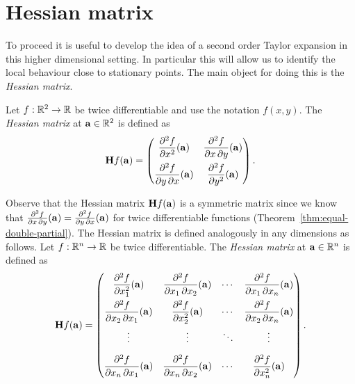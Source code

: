 \section{Hessian matrix}

To proceed it is useful to develop the idea of a second order Taylor expansion in this higher dimensional setting.
In particular this will allow us to identify the local behaviour close to stationary points.
The main object for doing this is the \emph{Hessian matrix}.

\begin{definition}
    Let \(f:\bR^2 \to\bR\) be twice differentiable and use the notation \(f(x,y)\).
    The \emph{Hessian matrix} at \(\aa\in \bR^2\) is defined as
    \[
        \mathbf{H} f (\aa)= \begin{pmatrix}
            \dfrac{\partial^2 f}{\partial x^2} (\aa)
             & \dfrac{\partial^2 f}{\partial x\,\partial y} (\aa)
            \\[2.2ex]
            \dfrac{\partial^2 f}{\partial y\,\partial x} (\aa)
             & \dfrac{\partial^2 f}{\partial y^2}(\aa)
        \end{pmatrix}.
    \]
\end{definition}

Observe that the Hessian matrix \(\mathbf{H} f (\aa)\) is a symmetric matrix since we know that \(\frac{\partial^2 f}{\partial x\,\partial y} (\aa) = \frac{\partial^2 f}{\partial y\,\partial x} (\aa)\) for twice differentiable functions (Theorem~\ref{thm:equal-double-partial}).
The Hessian matrix is defined analogously in any dimensions as follows.
Let \(f:\bR^n \to\bR\) be twice differentiable.
The \emph{Hessian matrix} at \(\aa\in \bR^n\) is defined as
\[
    \mathbf{H} f (\aa)= \begin{pmatrix}
        \dfrac{\partial^2 f}{\partial x_1^2} (\aa)
         & \dfrac{\partial^2 f}{\partial x_1\,\partial x_2} (\aa)
         & \cdots
         & \dfrac{\partial^2 f}{\partial x_1\,\partial x_n}(\aa)  \\[2.2ex]
        \dfrac{\partial^2 f}{\partial x_2\,\partial x_1} (\aa)
         & \dfrac{\partial^2 f}{\partial x_2^2}(\aa)
         & \cdots
         & \dfrac{\partial^2 f}{\partial x_2\,\partial x_n}(\aa)  \\[2.2ex]
        \vdots
         & \vdots
         & \ddots
         & \vdots                                                 \\[2.2ex]
        \dfrac{\partial^2 f}{\partial x_n\,\partial x_1} (\aa)
         & \dfrac{\partial^2 f}{\partial x_n\,\partial x_2} (\aa)
         & \cdots
         & \dfrac{\partial^2 f}{\partial x_n^2}(\aa)
    \end{pmatrix}.
\]


